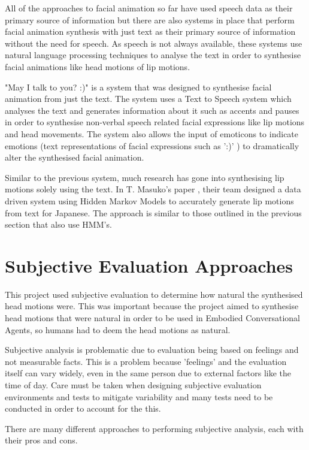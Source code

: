 \documentclass[bsc,frontabs,twoside,singlespacing,parskip]{infthesis}
\begin{document}
All of the approaches to facial animation so far have used speech data as their primary source of information but there are also systems in place that perform facial animation synthesis with just text as their primary source of information without the need for speech. As speech is not always available, these systems use natural language processing techniques to analyse the text in order to synthesise facial animations like head motions of lip motions.

"May I talk to you? :)"  \cite{may_i_talk_to_you} is a system that was designed to synthesise facial animation from just the text. The system uses a Text to Speech system which analyses the text and generates information about it such as accents and pauses in order to synthesise non-verbal speech related facial expressions like lip motions and head movements. The system also allows the input of emoticons to indicate emotions (text representations of facial expressions such as ':)' ) to dramatically alter the synthesised facial animation. 

Similar to the previous system, much research has gone into synthesising lip motions solely using the text. In T. Masuko's paper  \cite{lip_motion}, their team designed a data driven system using Hidden Markov Models to accurately generate lip motions from text for Japanese. The approach is similar to those outlined in the previous section that also use HMM's.

\section{Subjective Evaluation Approaches}

This project used subjective evaluation to determine how natural the synthesised head motions were. This was important because the project aimed to synthesise head motions that were natural in order to be used in Embodied Conversational Agents, so humans had to deem the head motions as natural.

Subjective analysis is problematic due to evaluation being based on feelings and not measurable facts. This is a problem because 'feelings' and the evaluation itself can vary widely, even in the same person due to external factors like the time of day. Care must be taken when designing subjective evaluation environments and tests to mitigate variability and many tests need to be conducted in order to account for the this. 

There are many different approaches to performing subjective analysis, each with their pros and cons. 
\end{document}
